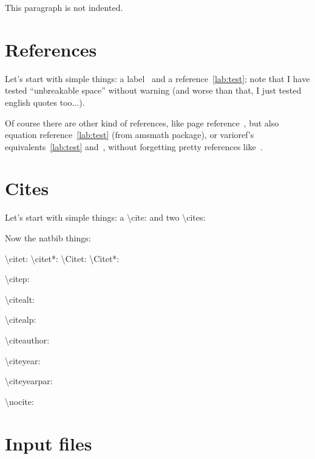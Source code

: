 \documentclass[a4paper,12pt]{article}
\begin{document}
\tableofcontents

\noindent This paragraph is not indented.

\section{References}

Let's start with simple things: a label~\label{lab:test} and a
reference~\ref{lab:test}; note that I have tested ``unbreakable
space'' without warning (and worse than that, I just tested english
quotes too...).

Of course there are other kind of references, like page
reference~\pageref{lab:test}, but also equation
reference~\eqref{lab:test} (from amsmath package), or varioref's
equivalents~\vref{lab:test} and~, without
forgetting pretty references like~.

\section{Cites}

Let's start with simple things: a \textbackslash{}cite: \citet{article-crossref}
and two \textbackslash{}cites: \citep{whole-set,article-crossref}

Now the natbib things:

\textbackslash{}citet: \citet[before][after]{article-crossref} \textbackslash{}citet{*}:
\citet*[before][after]{article-crossref} \textbackslash{}Citet: 
\textbackslash{}Citet{*}: 

\textbackslash{}citep: \citep{article-crossref}

\textbackslash{}citealt: \citealt{article-crossref}

\textbackslash{}citealp: \citealp{article-crossref}

\textbackslash{}citeauthor: \citeauthor{article-crossref}

\textbackslash{}citeyear: \citeyear{article-crossref}

\textbackslash{}citeyearpar: \citeyearpar{article-crossref}

\textbackslash{}nocite: \nocite{article-crossref}




\section{Input files}
\end{document}
